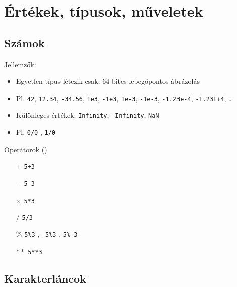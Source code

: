 \section{Értékek, típusok, műveletek}

\subsection{Számok}

\begin{frame}
    Jellemzők:
    \begin{itemize}
        \item Egyetlen típus létezik csak: 64 bites lebegőpontos ábrázolás
        \item Pl. \texttt{42}, \texttt{12.34}, \texttt{-34.56}, \texttt{1e3}, \texttt{-1e3}, \texttt{1e-3}, \texttt{-1e-3}, \texttt{-1.23e-4}, \texttt{-1.23E+4}, \dots
        \item Különleges értékek: \texttt{Infinity}, \texttt{-Infinity}, \texttt{NaN}
        \item Pl. \texttt{0/0} , \texttt{1/0} 
    \end{itemize}
    \vfill
    Operátorok ()
    \begin{itemize}
        \item[$+$] \texttt{5+3} 
        \item[$-$] \texttt{5-3}  
        \item[$\times$] \texttt{5*3} 
        \item[$/$] \texttt{5/3} 
        \item[$\%$] \texttt{5\%3} , \texttt{-5\%3} , \texttt{5\%-3}  
        \item[$**$] \texttt{5**3}  
    \end{itemize}
\end{frame}

\subsection{Karakterláncok}

